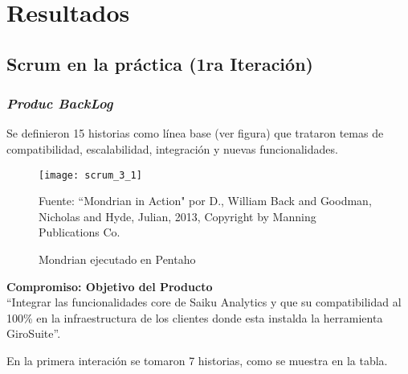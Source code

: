 \chapter{Resultados} \label{chapter:III}
\section{Scrum en la pr\'{a}ctica (1ra Iteraci\'{o}n)}
\begin{spacing}{1.5}
	\subsection{\textit{Produc BackLog}}
	Se definieron 15 historias como l\'{i}nea base (ver figura) que trataron temas de compatibilidad, escalabilidad, integraci\'{o}n y nuevas funcionalidades.
	
	\begin{figure}[H]
		\centering
		\texttt{[image: scrum\_3\_1]}
		\caption {\centering \small{Mondrian ejecutado en Pentaho}} \label{figure:chaperIII_1}
		\small {Fuente: ``Mondrian in Action" por D., William Back and Goodman, Nicholas and Hyde, Julian, 2013, Copyright by Manning Publications Co.}
	\end{figure}
	
	\textbf{Compromiso: Objetivo del Producto}\\
	``Integrar las funcionalidades core de Saiku Analytics y que su compatibilidad al 100\% en la infraestructura de los clientes donde esta instalda la herramienta GiroSuite''.
	
	En la primera interaci\'{o}n se tomaron 7 historias, como se muestra en la tabla. 
	


\end{spacing}
